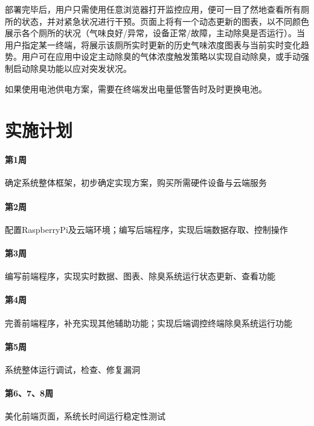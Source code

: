 \documentclass[UTF8]{ctexart}
\begin{document}
部署完毕后，用户只需使用任意浏览器打开监控应用，便可一目了然地查看所有厕所的状态，并对紧急状况进行干预。页面上将有一个动态更新的图表，以不同颜色展示各个厕所的状况（气味良好/异常，设备正常/故障，主动除臭是否运行）。当用户指定某一终端，将展示该厕所实时更新的历史气味浓度图表与当前实时变化趋势。用户可在应用中设定主动除臭的气体浓度触发策略以实现自动除臭，或手动强制启动除臭功能以应对突发状况。

如果使用电池供电方案，需要在终端发出电量低警告时及时更换电池。
\section{实施计划}
\paragraph{第1周}确定系统整体框架，初步确定实现方案，购买所需硬件设备与云端服务
\paragraph{第2周}配置RaspberryPi及云端环境；编写后端程序，实现后端数据存取、控制操作
\paragraph{第3周}编写前端程序，实现实时数据、图表、除臭系统运行状态更新、查看功能
\paragraph{第4周}完善前端程序，补充实现其他辅助功能；实现后端调控终端除臭系统运行功能
\paragraph{第5周}系统整体运行调试，检查、修复漏洞
\paragraph{第6、7、8周}美化前端页面，系统长时间运行稳定性测试
\end{document}
